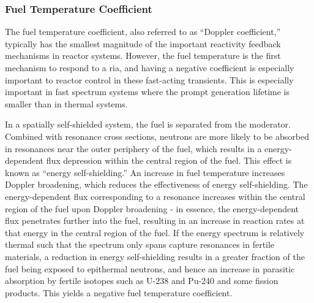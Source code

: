 \subsubsection{Fuel Temperature Coefficient}
The fuel temperature coefficient, also referred to as ``Doppler coefficient,'' typically has the smallest magnitude of the important reactivity feedback mechanisms in reactor systems. However, the fuel temperature is the first mechanism to respond to a \gls{ria}, and having a negative coefficient is especially important to reactor control in these fast-acting transients. This is especially important in fast spectrum systems where the prompt generation lifetime is smaller than in thermal systems. 

In a spatially self-shielded system, the fuel is separated from the moderator. Combined with resonance cross sections, neutrons are more likely to be absorbed in resonances near the outer periphery of the fuel, which results in a energy-dependent flux depression within the central region of the fuel. This effect is known as ``energy self-shielding.'' An increase in fuel temperature increases Doppler broadening, which reduces the effectiveness of energy self-shielding. The energy-dependent flux corresponding to a resonance increases within the central region of the fuel upon Doppler broadening - in essence, the energy-dependent flux penetrates further into the fuel, resulting in an increase in reaction rates at that energy in the central region of the fuel. If the energy spectrum is relatively thermal such that the spectrum only spans capture resonances in fertile materials, a reduction in energy self-shielding results in a greater fraction of the fuel being exposed to epithermal neutrons, and hence an increase in parasitic absorption by fertile isotopes such as U-238 and Pu-240 and some fission products. This yields a negative fuel temperature coefficient. %

